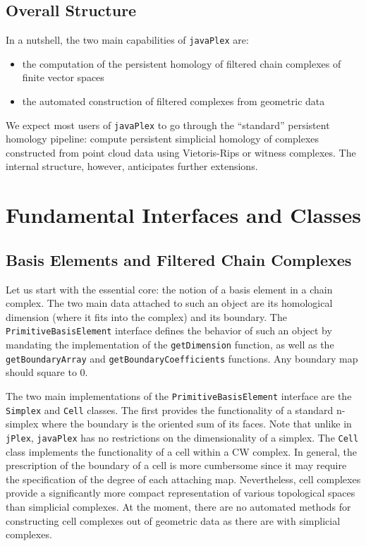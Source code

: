\documentclass[11pt]{amsart}
\newcommand\jPlex{\texttt{jPlex}\xspace}
\newcommand\javaPlex{\texttt{javaPlex}\xspace}
\begin{document}
\subsection{Overall Structure}

In a nutshell, the two main capabilities of \javaPlex are:
\begin{itemize}
\item the computation of the persistent homology of filtered chain complexes of finite vector spaces
\item the automated construction of filtered complexes from geometric data 
\end{itemize}

We expect most users of \javaPlex to go through the ``standard'' persistent homology pipeline: compute persistent simplicial homology of complexes constructed from point cloud data using Vietoris-Rips or witness complexes. The internal structure, however, anticipates further extensions.

\section{Fundamental Interfaces and Classes}
\subsection{Basis Elements and Filtered Chain Complexes}

Let us start with the essential core: the notion of a basis element in a chain complex. The two main data attached to such an object are its homological dimension (where it fits into the complex) and its boundary. The  \texttt{PrimitiveBasisElement} interface defines the behavior of such an object by mandating the implementation of the  \texttt{getDimension} function, as well as the  \texttt{getBoundaryArray} and  \texttt{getBoundaryCoefficients} functions. Any boundary map should square to 0.

The two main implementations of the  \texttt{PrimitiveBasisElement} interface are the  \texttt{Simplex} and  \texttt{Cell} classes. The first provides the functionality of a standard n-simplex where the boundary is the oriented sum of its faces. Note that unlike in \jPlex, \javaPlex has no restrictions on the dimensionality of a simplex. The  \texttt{Cell} class implements the functionality of a cell within a CW complex. In general, the prescription of the boundary of a cell is more cumbersome since it may require the specification of the degree of each attaching map. Nevertheless, cell complexes provide a significantly more compact representation of various topological spaces than simplicial complexes. At the moment, there are no automated methods for constructing cell complexes out of geometric data as there are with simplicial complexes.
\end{document}
